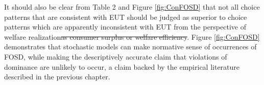\documentclass[11pt,a4paper]{article} %
\makeatletter
\newcommand{\cnline}[2][c]{%
	\setlength{\extrarowheight}{0em} %
	\begin{tabular}[#1]{@{}c@{}}#2\end{tabular} %
	\setlength{\extrarowheight}{5em} %
} %
\providecommand{\DIFdeltex}[1]{{\protect\color{red}\sout{#1}}}                      %
\providecommand{\DIFdelbegin}{} %
\providecommand{\DIFdelend}{} %
\providecommand{\DIFdel}[1]{\texorpdfstring{\DIFdeltex{#1}}{}} %
\newcommand{\DIFscaledelfig}{0.5}
\newlength{\DIFdelgraphicswidth} %
\newlength{\DIFdelgraphicsheight} %
\newcommand{\DIFdelincludegraphics}[2][]{%
\sbox{\DIFdelgraphicsbox}{\DIFOincludegraphics[#1]{#2}}%
\settoboxwidth{\DIFdelgraphicswidth}{\DIFdelgraphicsbox} %
\settoboxtotalheight{\DIFdelgraphicsheight}{\DIFdelgraphicsbox} %
\scalebox{\DIFscaledelfig}{%
\parbox[b]{\DIFdelgraphicswidth}{\usebox{\DIFdelgraphicsbox}\\[-\baselineskip] \rule{\DIFdelgraphicswidth}{0em}}\llap{\resizebox{\DIFdelgraphicswidth}{\DIFdelgraphicsheight}{%
\setlength{\unitlength}{\DIFdelgraphicswidth}%
\begin{picture}(1,1)%
\thicklines\linethickness{2pt} %
{\color[rgb]{1,0,0}\put(0,0){\framebox(1,1){}}}%
{\color[rgb]{1,0,0}\put(0,0){\line( 1,1){1}}}%
{\color[rgb]{1,0,0}\put(0,1){\line(1,-1){1}}}%
\end{picture}%
}\hspace*{3pt}}} %
} %
\DeclareRobustCommand{\DIFdelbegin}{\DIFOdelbegin \let\includegraphics\DIFdelincludegraphics} %
\DeclareRobustCommand{\DIFdelend}{\DIFOaddend \let\includegraphics\DIFOincludegraphics} %
\makeatother
\begin{document}
It should also be clear from Table 2 and Figure \ref{fig:ConFOSD} that not all choice patterns that are consistent with EUT should be judged as superior to choice patterns which are apparently inconsistent with EUT from the perspective of welfare realization\DIFdelbegin \DIFdel{as consumer surplus or welfare efficiency}\DIFdelend .
Figure \ref{fig:ConFOSD} demonstrates that stochastic models can make normative sense of occurrences of FOSD, while making the descriptively accurate claim that violations of dominance are unlikely to occur, a claim backed by the empirical literature described in the previous chapter.

\end{document}
